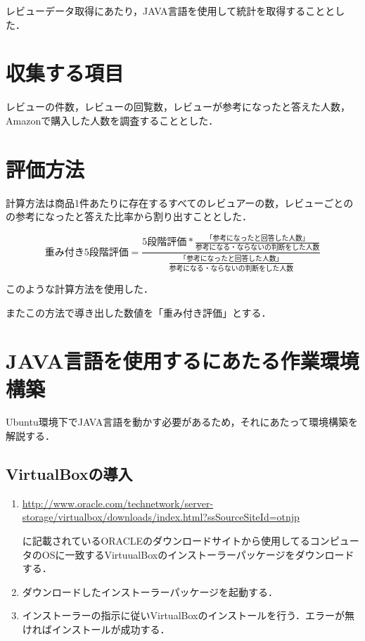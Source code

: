レビューデータ取得にあたり，JAVA言語を使用して統計を取得することとした．

\section{収集する項目}

レビューの件数，レビューの回覧数，レビューが参考になったと答えた人数，Amazonで購入した人数を調査することとした．

\section{評価方法}
\label{hyoukahouhou}

計算方法は商品1件あたりに存在するすべてのレビュアーの数，レビューごとのの参考になったと答えた比率から割り出すこととした．


\[
  重み付き5段階評価 = \frac{5段階評価*\frac{「参考になったと回答した人数」}{参考になる・ならないの判断をした人数}}{\frac{「参考になったと回答した人数」}{参考になる・ならないの判断をした人数}}
\]

このような計算方法を使用した．

またこの方法で導き出した数値を「重み付き評価」とする．

\section{JAVA言語を使用するにあたる作業環境構築}

Ubuntu環境下でJAVA言語を動かす必要があるため，それにあたって環境構築を解説する．


\subsection{VirtualBoxの導入}

\begin{enumerate}


 \item 	\url{http://www.oracle.com/technetwork/server-storage/virtualbox/downloads/index.html?ssSourceSiteId=otnjp} 

に記載されているORACLEのダウンロードサイトから使用してるコンピュータのOSに一致するVirtuualBoxのインストーラーパッケージをダウンロードする．

 \item 	ダウンロードしたインストーラーパッケージを起動する．

 \item 	インストーラーの指示に従いVirtualBoxのインストールを行う．エラーが無ければインストールが成功する．

\end{enumerate}

